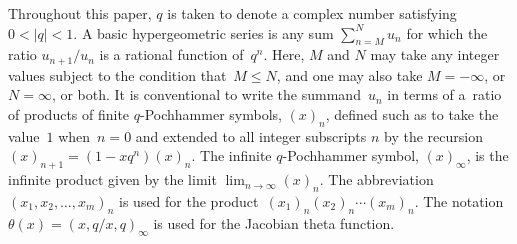 \documentclass[pdftex]{sigma}
\numberwithin{equation}{section}
\begin{document}
Throughout this paper, $q$ is taken to denote a complex number satisfying $0<|q|<1$. A basic hypergeometric series is any sum $\sum_{n=M}^N u_n$ for which the ratio $u_{n+1}/u_n$ is a rational function of~$q^n$. Here, $M$ and $N$ may take any integer values subject to the condition that~${M \leq N}$, and one may also take $M=-\infty$, or $N=\infty$, or both. It is conventional to write the summand~$u_n$ in terms of a~ratio of products of finite $q$-Pochhammer symbols, $(x)_n$, defined such as to take the value~$1$ when~${n=0}$ and extended to all integer subscripts $n$ by the recursion~${(x)_{n+1} = (1-xq^n)(x)_n}$. The infinite $q$-Pochhammer symbol, $(x)_\infty$, is the infinite product given by the limit $\lim_{n \rightarrow \infty} (x)_n$. The abbreviation $(x_1,x_2, \dots, x_m)_n$ is used for the product~${(x_1)_n (x_2)_n \cdots (x_m)_n}$. The notation~${\theta(x) = (x,q/x,q)_\infty}$ is used for the Jacobian theta function.
\end{document}
